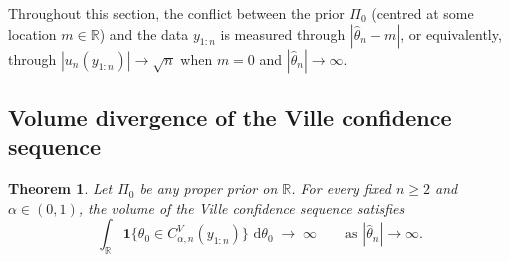 \documentclass{article}%
\newtheorem{theorem}{Theorem}[section]
\newcommand{\dd}{\,\mathrm{d}}
\newcommand{\one}{\boldsymbol{1}}
\newcommand{\1}{\mathbf{1}}
\begin{document}
Throughout this section, the conflict between the prior \(\Pi_0\) (centred at some location \(m\in\mathbb{R}\)) and the data \(y_{1:n}\) is measured through \(|\widehat\theta_n-m|\), or equivalently, through \(|u_n(y_{1:n})|\to\sqrt n\) when \(m=0\) and \(|\widehat\theta_n|\to
\infty\).

\subsection{Volume divergence of the Ville confidence sequence}
\label{sec:Ville-divergence}

\begin{theorem}\label{thm:CSVille-divergence}
Let \(\Pi_0\) be any proper prior on \(\mathbb{R}\). For every fixed \(n\geq 2\) and \(\alpha\in(0,1)\), the volume of the Ville confidence sequence satisfies
\[
   \int_\mathbb{R} \one\{\theta_0\in C^V_{\alpha,n}(y_{1:n})\}\,\dd\theta_0
   \;\longrightarrow\;\infty
   \qquad\text{as }|\widehat\theta_n|\to\infty.
\]
\end{theorem}
\end{document}
